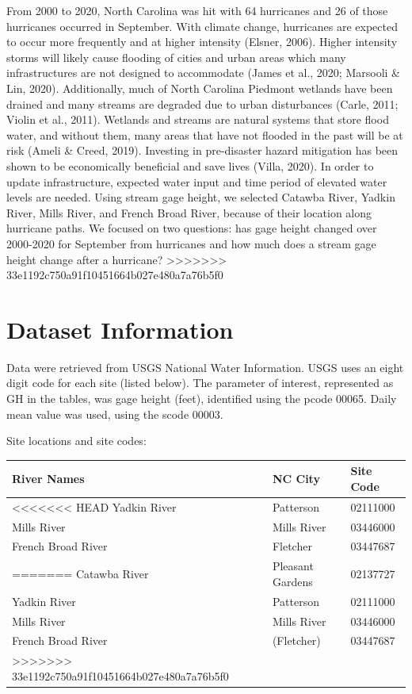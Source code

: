 \documentclass[
  12pt,
]{article}
\begin{document}
From 2000 to 2020, North Carolina was hit with 64 hurricanes and 26 of
those hurricanes occurred in September. With climate change, hurricanes
are expected to occur more frequently and at higher intensity (Elsner,
2006). Higher intensity storms will likely cause flooding of cities and
urban areas which many infrastructures are not designed to accommodate
(James et al., 2020; Marsooli \& Lin, 2020). Additionally, much of North
Carolina Piedmont wetlands have been drained and many streams are
degraded due to urban disturbances (Carle, 2011; Violin et al., 2011).
Wetlands and streams are natural systems that store flood water, and
without them, many areas that have not flooded in the past will be at
risk (Ameli \& Creed, 2019). Investing in pre-disaster hazard mitigation
has been shown to be economically beneficial and save lives (Villa,
2020). In order to update infrastructure, expected water input and time
period of elevated water levels are needed. Using stream gage height, we
selected Catawba River, Yadkin River, Mills River, and French Broad
River, because of their location along hurricane paths. We focused on
two questions: has gage height changed over 2000-2020 for September from
hurricanes and how much does a stream gage height change after a
hurricane?
>>>>>>> 33e1192c750a91f10451664b027e480a7a76b5f0

\newpage

\hypertarget{dataset-information}{%
\section{Dataset Information}\label{dataset-information}}

Data were retrieved from USGS National Water Information. USGS uses an
eight digit code for each site (listed below). The parameter of
interest, represented as GH in the tables, was gage height (feet),
identified using the pcode 00065. Daily mean value was used, using the
scode 00003.

Site locations and site codes:

\begin{longtable}[]{@{}lll@{}}
\toprule
River Names & NC City & Site Code\tabularnewline
\midrule
\endhead
<<<<<<< HEAD
Yadkin River & Patterson & 02111000\tabularnewline
Mills River & Mills River & 03446000\tabularnewline
French Broad River & Fletcher & 03447687\tabularnewline
=======
Catawba River & Pleasant Gardens & 02137727\tabularnewline
Yadkin River & Patterson & 02111000\tabularnewline
Mills River & Mills River & 03446000\tabularnewline
French Broad River & (Fletcher) & 03447687\tabularnewline
>>>>>>> 33e1192c750a91f10451664b027e480a7a76b5f0
\bottomrule
\end{longtable}
\end{document}
